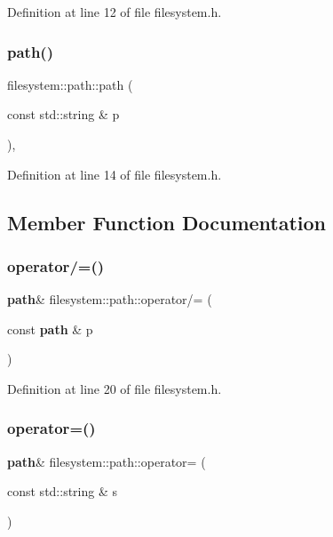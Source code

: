Definition at line 12 of file filesystem.\+h.

\mbox{\label{classfilesystem_1_1path_a86db96d2f27e594284a200fa6a0d2c4b}} 
\subsubsection{path()\hspace{0.1cm}{\footnotesize\ttfamily [2/2]}}
{\footnotesize\ttfamily filesystem\+::path\+::path (\begin{DoxyParamCaption}\item[{const std\+::string \&}]{p }\end{DoxyParamCaption})\hspace{0.3cm}{\ttfamily [inline]}, {\ttfamily [explicit]}}



Definition at line 14 of file filesystem.\+h.



\subsection{Member Function Documentation}
\mbox{\label{classfilesystem_1_1path_acfd0a349cb1c20ea2c65cc7325f456a0}} 
\subsubsection{operator/=()}
{\footnotesize\ttfamily \textbf{ path}\& filesystem\+::path\+::operator/= (\begin{DoxyParamCaption}\item[{const \textbf{ path} \&}]{p }\end{DoxyParamCaption})\hspace{0.3cm}{\ttfamily [inline]}}



Definition at line 20 of file filesystem.\+h.

\mbox{\label{classfilesystem_1_1path_aed7173cc676af0f678315750fb420ce9}} 
\subsubsection{operator=()\hspace{0.1cm}{\footnotesize\ttfamily [1/2]}}
{\footnotesize\ttfamily \textbf{ path}\& filesystem\+::path\+::operator= (\begin{DoxyParamCaption}\item[{const std\+::string \&}]{s }\end{DoxyParamCaption})\hspace{0.3cm}{\ttfamily [inline]}}



